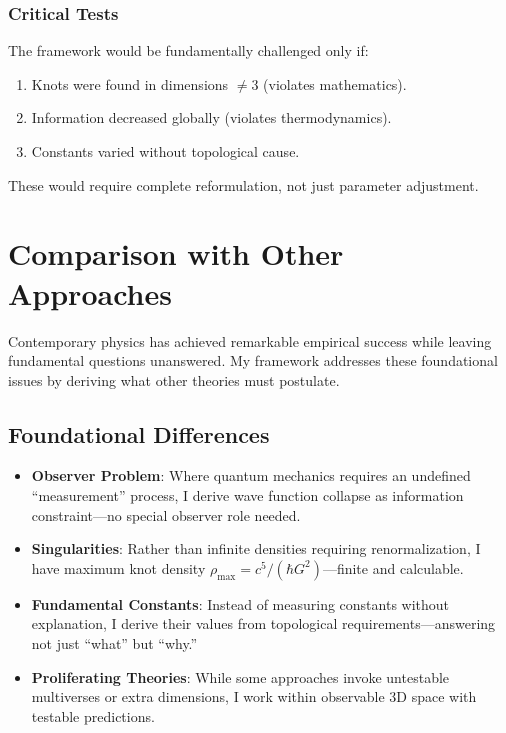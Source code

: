 \documentclass{article}
\begin{document}
\subsubsection{Critical Tests}
The framework would be fundamentally challenged only if:
\begin{enumerate}
\item Knots were found in dimensions $\neq 3$ (violates mathematics).
\item Information decreased globally (violates thermodynamics).
\item Constants varied without topological cause.
\end{enumerate}
These would require complete reformulation, not just parameter adjustment.

\section{Comparison with Other Approaches}
Contemporary physics has achieved remarkable empirical success while leaving fundamental questions unanswered. My framework addresses these foundational issues by deriving what other theories must postulate.

\subsection{Foundational Differences}
\begin{itemize}
\item \textbf{Observer Problem}: Where quantum mechanics requires an undefined ``measurement'' process, I derive wave function collapse as information constraint—no special observer role needed.
\item \textbf{Singularities}: Rather than infinite densities requiring renormalization, I have maximum knot density $\rho_{\max} = c^5 / (\hbar G^2)$—finite and calculable.
\item \textbf{Fundamental Constants}: Instead of measuring constants without explanation, I derive their values from topological requirements—answering not just ``what'' but ``why.''
\item \textbf{Proliferating Theories}: While some approaches invoke untestable multiverses or extra dimensions, I work within observable 3D space with testable predictions.
\end{itemize}
\end{document}
